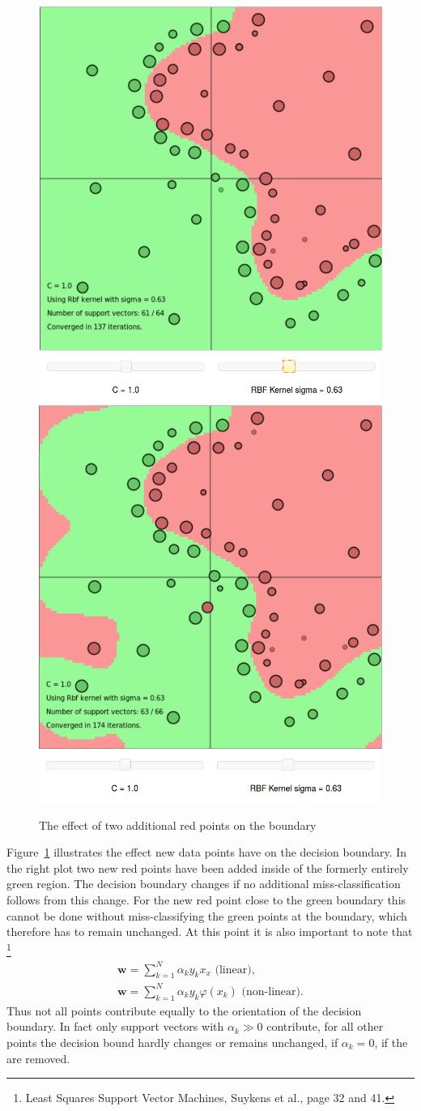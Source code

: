 \begin{figure}
\centering
\includegraphics[width=0.33\linewidth]{../src/figure/largeRBF}
\includegraphics[width=0.33\linewidth]{../src/figure/twoNewPoints}
\caption{The effect of two additional red points on the boundary}
\label{fig:twoNewPoints}
\end{figure}
Figure~\ref{fig:twoNewPoints} illustrates the effect new data points have on the decision boundary. In the right plot two new red points have been added inside of the formerly entirely green region. The decision boundary changes if no additional miss-classification follows from this change. For the new red point close to the green boundary this cannot be done without miss-classifying the green points at the boundary, which therefore has to remain unchanged. At this point it is also important to note that \footnote{Least Squares Support Vector Machines, Suykens et al., page 32 and 41.}
\begin{align}
\mathbf{w} = \sum\limits_{k = 1}^{N} \alpha_k y_k x_x  \text{  (linear)},\\
\mathbf{w} = \sum\limits_{k = 1}^{N} \alpha_k y_k \varphi (x_k) \text{  (non-linear)}.
\end{align} 
Thus not all points contribute equally to the orientation of the decision boundary. In fact only support vectors with $\alpha_k \gg 0$ contribute, for all other points the decision bound hardly changes or remains unchanged, if $\alpha_k = 0$, if the are removed.

